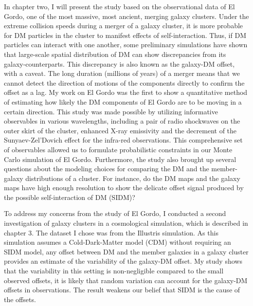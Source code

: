 			In chapter two, I will present the study based on the observational data 
			of El Gordo, one of the most massive, most ancient, merging galaxy clusters. 
		Under the extreme collision speeds during a merger of a galaxy cluster, 
		it is more probable for DM particles in the cluster to manifest effects of
		self-interaction. 
		Thus, if DM particles can interact with one another, 		
		some preliminary simulations have shown that large-scale spatial distribution of DM
		can show discrepancies from its galaxy-counterparts. This discrepancy 
		is also known as the galaxy-DM offset, with a caveat. The long duration 
		(millions of years) 
		of a merger means that we cannot detect the
		direction of motions of the components directly to confirm the offset as
		a lag. My work on El Gordo was the first to show a quantitative method of estimating
		how likely the DM components of El Gordo are to be moving in a certain
		direction.	This study was made possible by utilizing informative
		observables in various wavelengths, including a pair of radio shockwaves on
		the outer skirt of the cluster, enhanced X-ray emissivity and the decrement of the
		Sunyaev-Zel'Dovich effect for the infra-red observations.
		This comprehensive set of observables allowed us to formulate 
		probabilistic constraints in our Monte Carlo simulation of El Gordo.
		Furthermore, the study also brought up several questions about the modeling
		choices for comparing the DM and the member-galaxy distributions of a cluster.
		For instance, do the DM maps and the galaxy maps have high enough
		resolution to show the delicate offset signal produced by the possible
		self-interaction of DM (SIDM)?
		
		To address my concerns from the study of El Gordo, 
		I conducted a second investigation of galaxy clusters in a cosmological
		simulation, which is described in chapter 3. The dataset I chose was from 
		the Illustris simulation. As this simulation
		assumes a Cold-Dark-Matter model (CDM) without requiring an SIDM model, 
		any offset between DM and the member galaxies in a 
		galaxy cluster provides an estimate of the variability of the galaxy-DM offset.  My
		study shows that 
		the variability in this setting is non-negligible compared to the
		small observed offsets, it is
		likely that random variation can account for the
		galaxy-DM offsets in observations. The result weakens our belief that SIDM is the
		cause of the offsets. 

